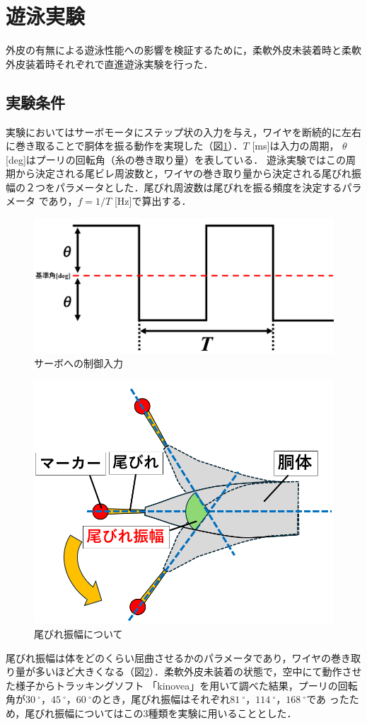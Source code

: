 \newpage
\section{遊泳実験}
外皮の有無による遊泳性能への影響を検証するために，柔軟外皮未装着時と柔軟外皮装着時それぞれで直進遊泳実験を行った．

\subsection{実験条件}
実験においてはサーボモータにステップ状の入力を与え，ワイヤを断続的に左右に巻き取ることで胴体を振る動作を実現した（図\ref{fig:servo_seigyo}）．$T$ [ms]は入力の周期，
$\theta$ [deg]はプーリの回転角（糸の巻き取り量）を表している．
遊泳実験ではこの周期から決定される尾ビレ周波数と，ワイヤの巻き取り量から決定される尾びれ振幅の２つをパラメータとした．尾びれ周波数は尾びれを振る頻度を決定するパラメータ
であり，$f = 1/T$ [Hz]で算出する．
\begin{figure}[hb]
    \centering
    \includegraphics[width=0.75\linewidth]{chapters/picture/servo2.png}
    \caption{サーボへの制御入力}
    \label{fig:servo_seigyo}
\end{figure}
\begin{figure}[hb]
    \centering
    \includegraphics[width=0.6\linewidth]{chapters/picture/obire_amp.png}
    \caption{尾びれ振幅について}
    \label{fig:obire_amp}
\end{figure}
尾びれ振幅は体をどのくらい屈曲させるかのパラメータであり，ワイヤの巻き取り量が多いほど大きくなる（図\ref{fig:obire_amp}）．柔軟外皮未装着の状態で，空中にて動作させた様子からトラッキングソフト
「kinovea」を用いて調べた結果，プーリの回転角が$30\:^\circ$，$45\:^\circ$，$60\:^\circ$のとき，尾びれ振幅はそれぞれ$81\:^\circ$，$114\:^\circ$，$168\:^\circ$であ
ったため，尾びれ振幅についてはこの3種類を実験に用いることとした． 

